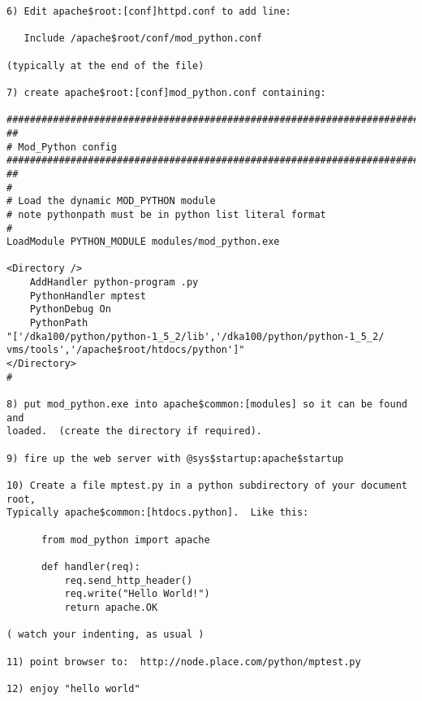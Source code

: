 \begin{verbatim}
6) Edit apache$root:[conf]httpd.conf to add line:

   Include /apache$root/conf/mod_python.conf

(typically at the end of the file)

7) create apache$root:[conf]mod_python.conf containing:

############################################################################
##
# Mod_Python config
############################################################################
##
#
# Load the dynamic MOD_PYTHON module
# note pythonpath must be in python list literal format
#
LoadModule PYTHON_MODULE modules/mod_python.exe

<Directory />
    AddHandler python-program .py
    PythonHandler mptest
    PythonDebug On
    PythonPath
"['/dka100/python/python-1_5_2/lib','/dka100/python/python-1_5_2/
vms/tools','/apache$root/htdocs/python']"
</Directory>
#

8) put mod_python.exe into apache$common:[modules] so it can be found and
loaded.  (create the directory if required).  

9) fire up the web server with @sys$startup:apache$startup

10) Create a file mptest.py in a python subdirectory of your document root,  
Typically apache$common:[htdocs.python].  Like this:

      from mod_python import apache

      def handler(req):
          req.send_http_header()
          req.write("Hello World!")
          return apache.OK 

( watch your indenting, as usual )

11) point browser to:  http://node.place.com/python/mptest.py

12) enjoy "hello world"
\end{verbatim}
